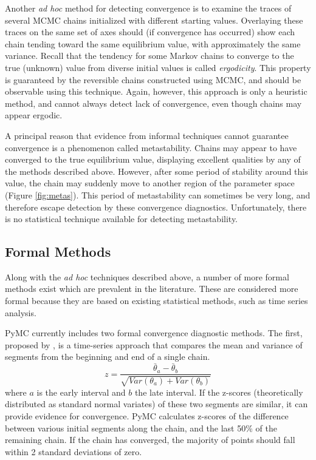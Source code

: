 Another \emph{ad hoc} method for detecting convergence is to examine the traces of several MCMC chains initialized with different starting values. Overlaying these traces on the same set of axes should (if convergence has occurred) show each chain tending toward the same equilibrium value, with approximately the same variance. Recall that the tendency for some Markov chains to converge to the true (unknown) value from diverse initial values is called \emph{ergodicity}. This property is guaranteed by the reversible chains constructed using MCMC, and should be observable using this technique. Again, however, this approach is only a heuristic method, and cannot always detect lack of convergence, even though chains may appear ergodic.

A principal reason that evidence from informal techniques cannot guarantee convergence is a phenomenon called metastability. Chains may appear to have converged to the true equilibrium value, displaying excellent qualities by any of the methods described above. However, after some period of stability around this value, the chain may suddenly move to another region of the parameter space (Figure \ref{fig:metas}). This period of metastability can sometimes be very long, and therefore escape detection by these convergence diagnostics. Unfortunately, there is no statistical technique available for detecting metastability.

\subsection{Formal Methods}

Along with the \emph{ad hoc} techniques described above, a number of more formal methods exist which are prevalent in the literature. These are considered more formal because they are based on existing statistical methods, such as time series analysis.

PyMC currently includes two formal convergence diagnostic methods. The first, proposed by \citet{Geweke:1992gm}, is a time-series approach that compares the mean and variance of segments from the beginning and end of a single chain.
\begin{equation}
z = \frac{\bar{\theta}_a - \bar{\theta}_b}{\sqrt{Var(\theta_a) + Var(\theta_b)}}
\end{equation}
where $a$ is the early interval and $b$ the late interval. If the z-scores (theoretically distributed as standard normal variates) of these two segments are similar, it can provide evidence for convergence. PyMC calculates z-scores of the difference between various initial segments along the chain, and the last 50\% of the remaining chain. If the chain has converged, the majority of points should fall within 2 standard deviations of zero.

